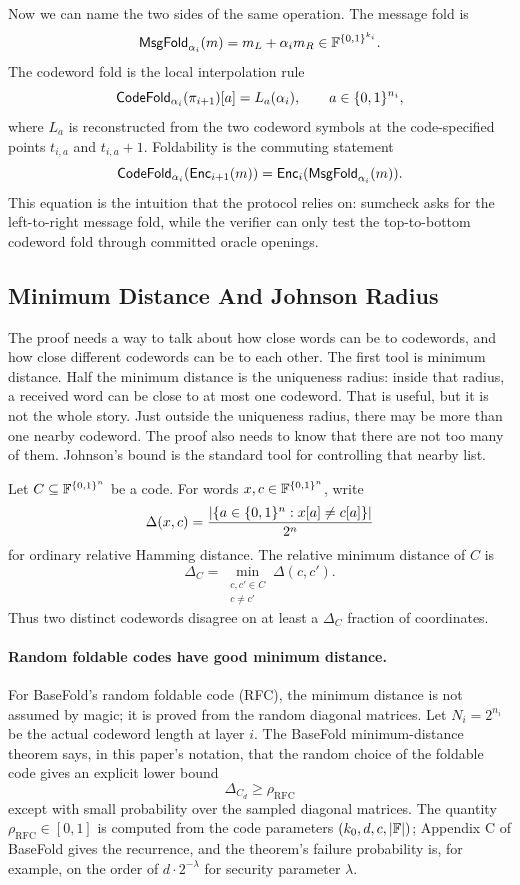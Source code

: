 Now we can name the two sides of the same operation.  The message fold is
\[
  \mathsf{MsgFold}_{\alpha_i}(m)=m_L+\alpha_i m_R\in\mathbb{F}^{\{0,1\}^{k_i}}.
\]
The codeword fold is the local interpolation rule
\[
  \mathsf{CodeFold}_{\alpha_i}(\pi_{i+1})[a]=L_a(\alpha_i),
  \qquad a\in\{0,1\}^{n_i},
\]
where $L_a$ is reconstructed from the two codeword symbols at the
code-specified points $t_{i,a}$ and $t_{i,a}+1$.  Foldability is the
commuting statement
\[
  \mathsf{CodeFold}_{\alpha_i}(\mathsf{Enc}_{i+1}(m))
  =
  \mathsf{Enc}_i(\mathsf{MsgFold}_{\alpha_i}(m)).
\]
This equation is the intuition that the protocol relies on: sumcheck asks for
the left-to-right message fold, while the verifier can only test the
top-to-bottom codeword fold through committed oracle openings.

\subsection{Minimum Distance And Johnson Radius}

The proof needs a way to talk about how close words can be to codewords, and
how close different codewords can be to each other.  The first tool is minimum
distance.  Half the minimum distance is the uniqueness radius: inside that
radius, a received word can be close to at most one codeword.  That is useful,
but it is not the whole story.  Just outside the uniqueness radius, there may be
more than one nearby codeword.  The proof also needs to know that there are not
too many of them.  Johnson's bound is the standard tool for controlling that
nearby list.

Let $C\subseteq\mathbb{F}^{\{0,1\}^n}$ be a code.  For words $x,c\in\mathbb{F}^{\{0,1\}^n}$, write
\[
  \Delta(x,c)
  =
  \frac{|\{a\in\{0,1\}^n:x[a]\ne c[a]\}|}{2^n}
\]
for ordinary relative Hamming distance.  The relative minimum distance of $C$
is
\[
  \Delta_C
  =
  \min_{\substack{c,c'\in C\\ c\ne c'}}\Delta(c,c').
\]
Thus two distinct codewords disagree on at least a $\Delta_C$ fraction of
coordinates.

\paragraph{Random foldable codes have good minimum distance.}
For BaseFold's random foldable code (RFC), the minimum distance is not assumed by
magic; it is proved from the random diagonal matrices.  Let
$N_i=2^{n_i}$ be the actual codeword length at layer $i$.  The BaseFold
minimum-distance theorem says, in this paper's notation, that the random choice
of the foldable code gives an explicit lower bound
\[
  \Delta_{C_d}\ge \rho_{\mathrm{RFC}}
\]
except with small probability over the sampled diagonal matrices.  The quantity
$\rho_{\mathrm{RFC}}\in[0,1]$ is computed from the code parameters
$(k_0,d,c,|\mathbb{F}|)$; Appendix C of BaseFold gives the recurrence, and the theorem's
failure probability is, for example, on the order of $d\cdot 2^{-\lambda}$ for
security parameter $\lambda$.

